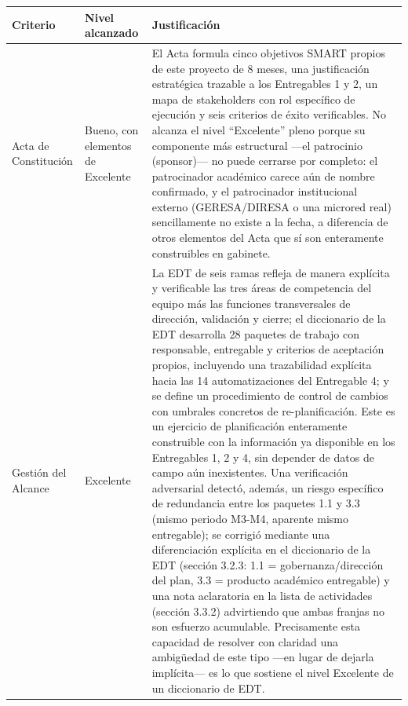 \documentclass[11pt,a4paper]{article}
\begin{document}
{\small
\begin{longtable}[]{@{}
  >{\raggedright\arraybackslash}p{}
  >{\raggedright\arraybackslash}p{}
  >{\raggedright\arraybackslash}p{}@{}}
\toprule\noalign{}
\begin{minipage}[b]{\linewidth}\raggedright
Criterio
\end{minipage} & \begin{minipage}[b]{\linewidth}\raggedright
Nivel alcanzado
\end{minipage} & \begin{minipage}[b]{\linewidth}\raggedright
Justificación
\end{minipage} \\
\midrule\noalign{}
\endhead
\bottomrule\noalign{}
\endlastfoot
Acta de Constitución & Bueno, con elementos de Excelente & El Acta formula cinco objetivos SMART propios de este proyecto de 8 meses, una justificación estratégica trazable a los Entregables 1 y 2, un mapa de stakeholders con rol específico de ejecución y seis criterios de éxito verificables. No alcanza el nivel ``Excelente'' pleno porque su componente más estructural ---el patrocinio (sponsor)--- no puede cerrarse por completo: el patrocinador académico carece aún de nombre confirmado, y el patrocinador institucional externo (GERESA/DIRESA o una microred real) sencillamente no existe a la fecha, a diferencia de otros elementos del Acta que sí son enteramente construibles en gabinete. \\
Gestión del Alcance & Excelente & La EDT de seis ramas refleja de manera explícita y verificable las tres áreas de competencia del equipo más las funciones transversales de dirección, validación y cierre; el diccionario de la EDT desarrolla 28 paquetes de trabajo con responsable, entregable y criterios de aceptación propios, incluyendo una trazabilidad explícita hacia las 14 automatizaciones del Entregable 4; y se define un procedimiento de control de cambios con umbrales concretos de re-planificación. Este es un ejercicio de planificación enteramente construible con la información ya disponible en los Entregables 1, 2 y 4, sin depender de datos de campo aún inexistentes. Una verificación adversarial detectó, además, un riesgo específico de redundancia entre los paquetes 1.1 y 3.3 (mismo periodo M3-M4, aparente mismo entregable); se corrigió mediante una diferenciación explícita en el diccionario de la EDT (sección 3.2.3: 1.1 = gobernanza/dirección del plan, 3.3 = producto académico entregable) y una nota aclaratoria en la lista de actividades (sección 3.3.2) advirtiendo que ambas franjas no son esfuerzo acumulable. Precisamente esta capacidad de resolver con claridad una ambigüedad de este tipo ---en lugar de dejarla implícita--- es lo que sostiene el nivel Excelente de un diccionario de EDT. \\

\end{longtable}}
\end{document}
